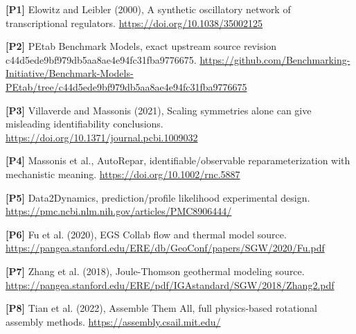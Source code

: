 \documentclass[11pt,letterpaper]{article}
\begin{document}
\begin{samepage}
\small\textbf{[P1]} Elowitz and Leibler (2000), A synthetic oscillatory network of transcriptional regulators. \url{https://doi.org/10.1038/35002125}\par
\normalsize
\end{samepage}
\begin{samepage}
\small\textbf{[P2]} PEtab Benchmark Models, exact upstream source revision c44d5ede9bf979db5aa8ae4e94fc31fba9776675. \url{https://github.com/Benchmarking-Initiative/Benchmark-Models-PEtab/tree/c44d5ede9bf979db5aa8ae4e94fc31fba9776675}\par
\normalsize
\end{samepage}
\begin{samepage}
\small\textbf{[P3]} Villaverde and Massonis (2021), Scaling symmetries alone can give misleading identifiability conclusions. \url{https://doi.org/10.1371/journal.pcbi.1009032}\par
\normalsize
\end{samepage}
\begin{samepage}
\small\textbf{[P4]} Massonis et al., AutoRepar, identifiable/observable reparameterization with mechanistic meaning. \url{https://doi.org/10.1002/rnc.5887}\par
\normalsize
\end{samepage}
\begin{samepage}
\small\textbf{[P5]} Data2Dynamics, prediction/profile likelihood experimental design. \url{https://pmc.ncbi.nlm.nih.gov/articles/PMC8906444/}\par
\normalsize
\end{samepage}
\begin{samepage}
\small\textbf{[P6]} Fu et al. (2020), EGS Collab flow and thermal model source. \url{https://pangea.stanford.edu/ERE/db/GeoConf/papers/SGW/2020/Fu.pdf}\par
\normalsize
\end{samepage}
\begin{samepage}
\small\textbf{[P7]} Zhang et al. (2018), Joule-Thomson geothermal modeling source. \url{https://pangea.stanford.edu/ERE/pdf/IGAstandard/SGW/2018/Zhang2.pdf}\par
\normalsize
\end{samepage}
\begin{samepage}
\small\textbf{[P8]} Tian et al. (2022), Assemble Them All, full physics-based rotational assembly methods. \url{https://assembly.csail.mit.edu/}\par
\normalsize
\end{samepage}
\end{document}
